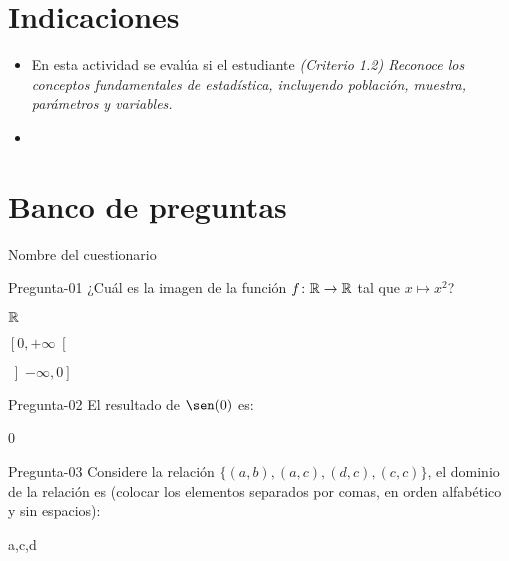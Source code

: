 \documentclass[a4,11pt]{aleph-notas}
\begin{document}
\encabezado

\vspace*{-8mm}
\section{Indicaciones}

\begin{itemize}[leftmargin=*]
\item 
    En esta actividad se evalúa si el estudiante \textit{(Criterio 1.2) Reconoce los conceptos fundamentales de estadística, incluyendo población, muestra, parámetros y variables.}
\item
    
\end{itemize}

\section{Banco de preguntas}

\begin{quiz}{Nombre del cuestionario}

\begin{multi}[%
    feedback={La respuesta correcta es $\left[0,+\infty\right[$}
    ]%
    {Pregunta-01}
    ¿Cuál es la imagen de la función $f\colon \mathbb{R} \rightarrow \mathbb{R}$ tal que $x\mapsto x^2$?
    \item $\mathbb{R}$
    \item* $\left[0,+\infty\right[$
    \item $\left]-\infty,0\right]$
\end{multi}

\begin{numerical}[tolerance=0.1,%
    feedback={Se tiene que $\sen(0)=1$.}
    ]%
    {Pregunta-02}
    El resultado de $\sen(0)$ es:
    \item 0
\end{numerical}

\begin{shortanswer}[%
    feedback={El dominio de la relación es $\{a,c,d\}$}
    ]%
    {Pregunta-03}
    Considere la relación $\{(a,b), (a,c), (d,c), (c,c)\}$, el dominio de la relación es (colocar los elementos separados por comas, en orden alfabético y sin espacios):
    \item a,c,d
\end{shortanswer}

\end{quiz}
\end{document}
